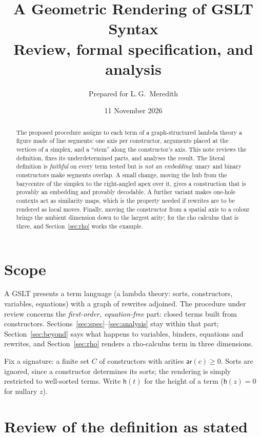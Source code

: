 \documentclass[11pt]{article}
\title{A Geometric Rendering of GSLT Syntax\\[2pt]\large Review, formal specification, and analysis}
\author{Prepared for L.\,G.\ Meredith}
\date{11 November 2026}
\theoremstyle{definition}
\theoremstyle{remark}
\newcommand{\ar}{\mathsf{ar}}
\newcommand{\hgt}{\mathsf{h}}
\begin{document}
\maketitle

\begin{abstract}
The proposed procedure assigns to each term of a graph-structured lambda theory a
figure made of line segments: one axis per constructor, arguments placed at the
vertices of a simplex, and a ``stem'' along the constructor's axis. This note
reviews the definition, fixes its underdetermined parts, and analyses the result.
The literal definition is \emph{faithful} on every term tested but is \emph{not an
embedding}: unary and binary constructors make segments overlap. A small change,
moving the hub from the barycentre of the simplex to the right-angled apex over it,
gives a construction that is provably an embedding and provably decodable. A
further variant makes one-hole contexts act as similarity maps, which is the
property needed if rewrites are to be rendered as local moves. Finally, moving
the constructor from a spatial axis to a colour brings the ambient dimension down
to the largest arity; for the rho calculus that is three, and
Section~\ref{sec:rho} works the example.
\end{abstract}

\section{Scope}

A GSLT presents a term language (a lambda theory: sorts, constructors, variables,
equations) with a graph of rewrites adjoined. The procedure under review concerns
the \emph{first-order, equation-free} part: closed terms built from constructors.
Sections~\ref{sec:spec}--\ref{sec:analysis} stay within that part;
Section~\ref{sec:beyond} says what happens to variables, binders, equations and
rewrites, and Section~\ref{sec:rho} renders a rho-calculus term in three
dimensions.

Fix a signature: a finite set $C$ of constructors with arities $\ar(c)\ge 0$.
Sorts are ignored, since a constructor determines its sorts; the rendering is
simply restricted to well-sorted terms. Write $\hgt(t)$ for the height of a term
($\hgt(z)=0$ for nullary $z$).

\section{Review of the definition as stated}\label{sec:review}
\end{document}
